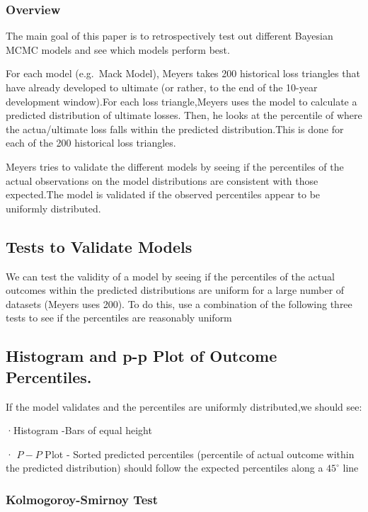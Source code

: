 \documentclass[
]{article}
\begin{document}
\subsubsection{Overview}\label{overview-10}

The main goal of this paper is to retrospectively test out different
Bayesian MCMC models and see which models perform best.

For each model (e.g.~Mack Model), Meyers takes 200 historical loss
triangles that have already developed to ultimate (or rather, to the end
of the 10-year development window).For each loss triangle,Meyers uses
the model to calculate a predicted distribution of ultimate losses.
Then, he looks at the percentile of where the actua/ultimate loss falls
within the predicted distribution.This is done for each of the 200
historical loss triangles.

Meyers tries to validate the different models by seeing if the
percentiles of the actual observations on the model distributions are
consistent with those expected.The model is validated if the observed
percentiles appear to be uniformly distributed.

\subsection{Tests to Validate Models}\label{tests-to-validate-models}

We can test the validity of a model by seeing if the percentiles of the
actual outcomes within the predicted distributions are uniform for a
large number of datasets (Meyers uses 200). To do this, use a
combination of the following three tests to see if the percentiles are
reasonably uniform

\subsection{Histogram and p-p Plot of Outcome
Percentiles.}\label{histogram-and-p-p-plot-of-outcome-percentiles.}

If the model validates and the percentiles are uniformly distributed,we
should see:

·Histogram -Bars of equal height

· \(P-P\) Plot - Sorted predicted percentiles (percentile of actual
outcome within the predicted distribution) should follow the expected
percentiles along a \(45^{\circ}\) line

\subsubsection{Kolmogoroy-Smirnoy Test}\label{kolmogoroy-smirnoy-test}
\end{document}
